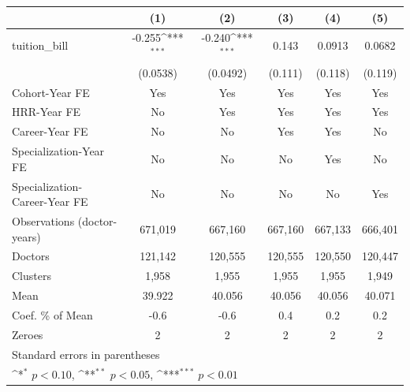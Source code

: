 {
\def\sym#1{\ifmmode^{#1}\else\(^{#1}\)\fi}
\begin{tabular}{l*{5}{c}}
\hline\hline
                    &\multicolumn{1}{c}{(1)}         &\multicolumn{1}{c}{(2)}         &\multicolumn{1}{c}{(3)}         &\multicolumn{1}{c}{(4)}         &\multicolumn{1}{c}{(5)}         \\
\hline
tuition\_bill        &      -0.255\sym{***}&      -0.240\sym{***}&       0.143         &      0.0913         &      0.0682         \\
                    &    (0.0538)         &    (0.0492)         &     (0.111)         &     (0.118)         &     (0.119)         \\
[1em]
Cohort-Year FE      &         Yes         &         Yes         &         Yes         &         Yes         &         Yes         \\
[1em]
HRR-Year FE         &          No         &         Yes         &         Yes         &         Yes         &         Yes         \\
[1em]
Career-Year FE      &          No         &          No         &         Yes         &         Yes         &          No         \\
[1em]
Specialization-Year FE&          No         &          No         &          No         &         Yes         &          No         \\
[1em]
Specialization-Career-Year FE&          No         &          No         &          No         &          No         &         Yes         \\
\hline
Observations (doctor-years)&     671,019         &     667,160         &     667,160         &     667,133         &     666,401         \\
Doctors             &     121,142         &     120,555         &     120,555         &     120,550         &     120,447         \\
Clusters            &       1,958         &       1,955         &       1,955         &       1,955         &       1,949         \\
Mean                &      39.922         &      40.056         &      40.056         &      40.056         &      40.071         \\
Coef. \% of Mean    &        -0.6         &        -0.6         &         0.4         &         0.2         &         0.2         \\
Zeroes              &           2         &           2         &           2         &           2         &           2         \\
\hline\hline
\multicolumn{6}{l}{\footnotesize Standard errors in parentheses}\\
\multicolumn{6}{l}{\footnotesize \sym{*} \(p<0.10\), \sym{**} \(p<0.05\), \sym{***} \(p<0.01\)}\\
\end{tabular}
}
